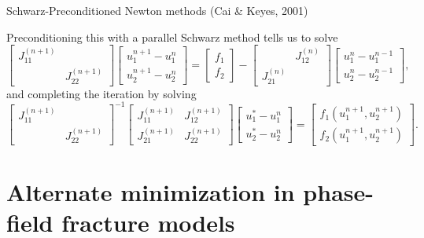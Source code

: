 \documentclass{beamer}
\begin{document}
\begin{frame}{Schwarz-Preconditioned Newton methods (Cai \& Keyes, 2001)}

Preconditioning this with a parallel Schwarz method tells us to solve
\begin{equation*}
	\begin{bmatrix} J_{11}^{(n+1)} \\ & J_{22}^{(n+1)} \end{bmatrix} \begin{bmatrix} u_1^{n+1} - u_1^n \\ u_2^{n+1} - u_2^n \end{bmatrix} = \begin{bmatrix} f_1 \\ f_2 \end{bmatrix} - \begin{bmatrix} & J_{12}^{(n)} \\ J_{21}^{(n)} \end{bmatrix} \begin{bmatrix} u_1^{n} - u_1^{n-1} \\ u_2^{n} - u_2^{n-1} \end{bmatrix},
\end{equation*}
and completing the iteration by solving
\begin{equation*}
	\begin{bmatrix} J_{11}^{(n+1)} \\ & J_{22}^{(n+1)} \end{bmatrix}^{-1} \begin{bmatrix} J_{11}^{(n+1)} & J_{12}^{(n+1)} \\ J_{21}^{(n+1)} & J_{22}^{(n+1)} \end{bmatrix} \begin{bmatrix} u_1^* - u_1^n \\ u_2^* - u_2^n \end{bmatrix}
	= \begin{bmatrix} f_1(u_1^{n+1},u_2^{n+1}) \\ f_2(u_1^{n+1},u_2^{n+1}) \end{bmatrix}.
\end{equation*}

\end{frame}

\section{Alternate minimization in phase-field fracture models} %
\end{document}
